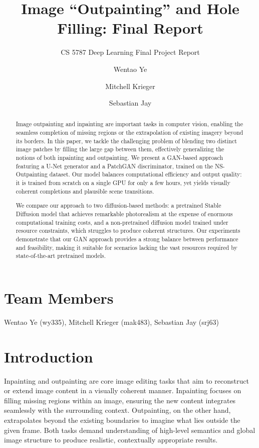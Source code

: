 \documentclass[sigconf]{acmart}
\title{Image “Outpainting” and Hole Filling: Final Report}
\subtitle{CS 5787 Deep Learning Final Project Report}
\author{Wentao Ye}
\affiliation{%
  \institution{Cornell University}
  \city{New York}
  \state{New York}
  \country{USA}
}
\author{Mitchell Krieger}
\affiliation{%
  \institution{Cornell University}
  \city{New York}
  \state{New York}
  \country{USA}
}
\author{Sebastian Jay}
\affiliation{%
  \institution{Cornell University}
  \city{New York}
  \state{New York}
  \country{USA}
}
\begin{document}
\begin{abstract}
    Image outpainting and inpainting are important tasks in computer vision, enabling the seamless completion of missing regions or the extrapolation of existing imagery beyond its borders. In this paper, we tackle the challenging problem of blending two distinct image patches by filling the large gap between them, effectively generalizing the notions of both inpainting and outpainting. We present a GAN-based approach featuring a U-Net generator and a PatchGAN discriminator, trained on the NS-Outpainting dataset. Our model balances computational efficiency and output quality: it is trained from scratch on a single GPU for only a few hours, yet yields visually coherent completions and plausible scene transitions.
    
    We compare our approach to two diffusion-based methods: a pretrained Stable Diffusion model that achieves remarkable photorealism at the expense of enormous computational training costs, and a non-pretrained diffusion model trained under resource constraints, which struggles to produce coherent structures. Our experiments demonstrate that our GAN approach provides a strong balance between performance and feasibility, making it suitable for scenarios lacking the vast resources required by state-of-the-art pretrained models.
\end{abstract}

\maketitle

\section*{Team Members}
Wentao Ye (wy335), Mitchell Krieger (mak483), Sebastian Jay (srj63)


\section{Introduction}
Inpainting and outpainting are core image editing tasks that aim to reconstruct or extend image content in a visually coherent manner. Inpainting focuses on filling missing regions within an image, ensuring the new content integrates seamlessly with the surrounding context. Outpainting, on the other hand, extrapolates beyond the existing boundaries to imagine what lies outside the given frame. Both tasks demand understanding of high-level semantics and global image structure to produce realistic, contextually appropriate results.
\end{document}
